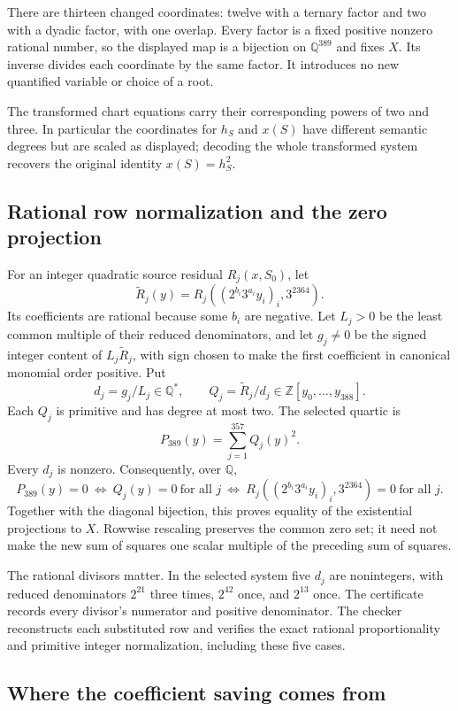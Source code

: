 There are thirteen changed coordinates: twelve with a ternary factor
and two with a dyadic factor, with one overlap. Every factor is a fixed
positive nonzero rational number, so the displayed map is a bijection
on $\mathbb Q^{389}$ and fixes $X$. Its inverse divides each coordinate
by the same factor. It introduces no new quantified variable or choice
of a root.

The transformed chart equations carry their corresponding powers of
two and three. In particular the coordinates for $h_S$ and $x(S)$ have
different semantic degrees but are scaled as displayed; decoding the
whole transformed system recovers the original identity $x(S)=h_S^2$.

\subsection{Rational row normalization and the zero projection}

For an integer quadratic source residual $R_j(x,S_0)$, let
\[
 \widetilde R_j(y)=R_j((2^{b_i}3^{a_i}y_i)_i,3^{2364}).
\]
Its coefficients are rational because some $b_i$ are negative. Let
$L_j>0$ be the least common multiple of their reduced denominators,
and let $g_j\ne0$ be the signed integer content of $L_j\widetilde R_j$,
with sign chosen to make the first coefficient in canonical monomial
order positive. Put
\[
 d_j=g_j/L_j\in\mathbb Q^*,\qquad
 Q_j=\widetilde R_j/d_j\in\mathbb Z[y_0,\ldots,y_{388}].
\]
Each $Q_j$ is primitive and has degree at most two. The selected quartic is
\[
 P_{389}(y)=\sum_{j=1}^{357}Q_j(y)^2.
\]
Every $d_j$ is nonzero. Consequently, over $\mathbb Q$,
\[
 P_{389}(y)=0
 \ \Longleftrightarrow\ 
 Q_j(y)=0\ \text{for all }j
 \ \Longleftrightarrow\ 
 R_j((2^{b_i}3^{a_i}y_i)_i,3^{2364})=0\ \text{for all }j.
\]
Together with the diagonal bijection, this proves equality of the
existential projections to $X$. Rowwise rescaling preserves the common
zero set; it need not make the new sum of squares one scalar multiple
of the preceding sum of squares.

The rational divisors matter. In the selected system five $d_j$ are
nonintegers, with reduced denominators $2^{21}$ three times,
$2^{42}$ once, and $2^{13}$ once. The certificate records every divisor's
numerator and positive denominator. The checker reconstructs each
substituted row and verifies the exact rational proportionality and
primitive integer normalization, including these five cases.

\subsection{Where the coefficient saving comes from}

